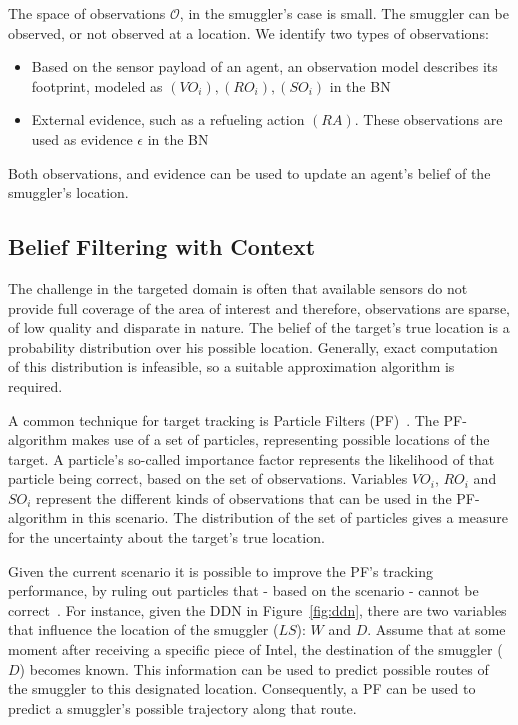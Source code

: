\documentclass[conference]{IEEEtran}
\begin{document}
The space of observations $\mathcal{O}$, in the smuggler's case is small. The smuggler can be observed, or not observed at a location. We identify two types of observations:
\begin{itemize}
\item Based on the sensor payload of an agent, an observation model describes its footprint, modeled as $(VO_i), (RO_i), (SO_i)$ in the BN
\item External evidence, such as a refueling action $(RA)$. These observations are used as evidence $\epsilon$ in the BN
\end{itemize}
Both observations, and evidence can be used to update an agent's belief of the smuggler's location.

\subsection{Belief Filtering with Context}
\label{subsec:belief-filter}

The challenge in the targeted domain is often that available sensors do not provide full coverage of the area of interest and therefore, observations are sparse, of low quality and disparate in nature. The belief of the target's true location is a probability distribution over his possible location. Generally, exact computation of this distribution is infeasible, so a suitable approximation algorithm is required.

A common technique for target tracking is Particle Filters (PF)~\cite{Blackman1999}. The PF-algorithm makes use of a set of particles, representing possible locations of the target. A particle's so-called importance factor represents the likelihood of that particle being correct, based on the set of observations. Variables $VO_i$, $RO_i$ and $SO_i$ represent the different kinds of observations that can be used in the PF-algorithm in this scenario. The distribution of the set of particles gives a measure for the uncertainty about the target's true location.

Given the current scenario it is possible to improve the PF's tracking performance, by ruling out particles that - based on the scenario - cannot be correct~\cite{Claessens2015}. For instance, given the DDN in Figure~\ref{fig:ddn}, there are two variables that influence the location of the smuggler ($LS$): $W$ and $D$. Assume that at some moment after receiving a specific piece of Intel, the destination of the smuggler ($D$) becomes known. This information can be used to predict possible routes of the smuggler to this designated location. Consequently, a PF can be used to predict a smuggler's possible trajectory along that route.
\end{document}
